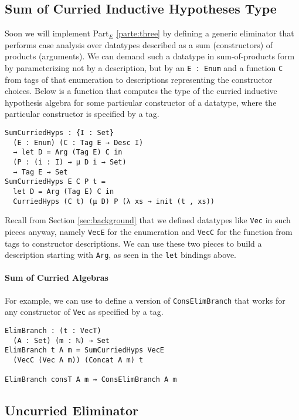 \documentclass[preprint,nonatbib]{sigplanconf}
\newcommand{\refsec}[1]{Section \ref{sec:#1}}
\newcommand{\refparte}[1]{Part$_E$ \ref{parte:#1}}
\begin{document}
\subsection{Sum of Curried Inductive Hypotheses Type}
\label{sec:elim:sum}

Soon we will implement \refparte{three} by defining a generic eliminator
that performs case analysis over datatypes described as a
sum (constructors) of products (arguments). We can demand such a
datatype in sum-of-products form by parameterizing not by a description,
but by an {\tt E : Enum} and a function {\tt C} from tags of that enumeration to
descriptions representing the constructor choices. Below is a function
that computes the type of the curried inductive hypothesis algebra for
some particular constructor of a datatype, where the particular
constructor is specified by a tag.

\begin{verbatim}
SumCurriedHyps : {I : Set}
  (E : Enum) (C : Tag E → Desc I)
  → let D = Arg (Tag E) C in
  (P : (i : I) → μ D i → Set)
  → Tag E → Set
SumCurriedHyps E C P t =
  let D = Arg (Tag E) C in
  CurriedHyps (C t) (μ D) P (λ xs → init (t , xs))
\end{verbatim}


Recall from
\refsec{background} that we defined datatypes like {\tt Vec} in such
pieces anyway, namely {\tt VecE} for the enumeration and {\tt VecC}
for the function from tags to constructor descriptions.
We can use these two
pieces to build a description starting with {\tt Arg}, as seen in the
{\tt let} bindings above.

\paragraph{Sum of Curried Algebras}

For example, we can use 
to define a version of
{\tt ConsElimBranch} that works for any constructor of {\tt Vec} as
specified by a tag.

\begin{verbatim}
ElimBranch : (t : VecT)
  (A : Set) (m : ℕ) → Set
ElimBranch t A m = SumCurriedHyps VecE
  (VecC (Vec A m)) (Concat A m) t

ElimBranch consT A m ⇝ ConsElimBranch A m
\end{verbatim}

\subsection{Uncurried Eliminator}
\end{document}
